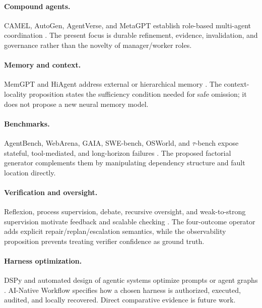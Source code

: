 \documentclass[11pt]{article}
\begin{document}
\paragraph{Compound agents.} CAMEL, AutoGen, AgentVerse, and MetaGPT establish role-based multi-agent coordination \citep{li2023camel,wu2023autogen,chen2024agentverse,hong2024metagpt}. The present focus is durable refinement, evidence, invalidation, and governance rather than the novelty of manager/worker roles.

\paragraph{Memory and context.} MemGPT and HiAgent address external or hierarchical memory \citep{packer2023memgpt,wang2024hiagent}. The context-locality proposition states the sufficiency condition needed for safe omission; it does not propose a new neural memory model.

\paragraph{Benchmarks.} AgentBench, WebArena, GAIA, SWE-bench, OSWorld, and $\tau$-bench expose stateful, tool-mediated, and long-horizon failures \citep{liu2024agentbench,zhou2024webarena,mialon2024gaia,jimenez2024swebench,xie2024osworld,yao2024taubench}. The proposed factorial generator complements them by manipulating dependency structure and fault location directly.

\paragraph{Verification and oversight.} Reflexion, process supervision, debate, recursive oversight, and weak-to-strong supervision motivate feedback and scalable checking \citep{shinn2023reflexion,lightman2023verify,irving2018debate,leike2018recursive,burns2024weakstrong}. The four-outcome operator adds explicit repair/replan/escalation semantics, while the observability proposition prevents treating verifier confidence as ground truth.

\paragraph{Harness optimization.} DSPy and automated design of agentic systems optimize prompts or agent graphs \citep{khattab2024dspy,hu2025adas}. AI-Native Workflow specifies how a chosen harness is authorized, executed, audited, and locally recovered. Direct comparative evidence is future work.
\end{document}
